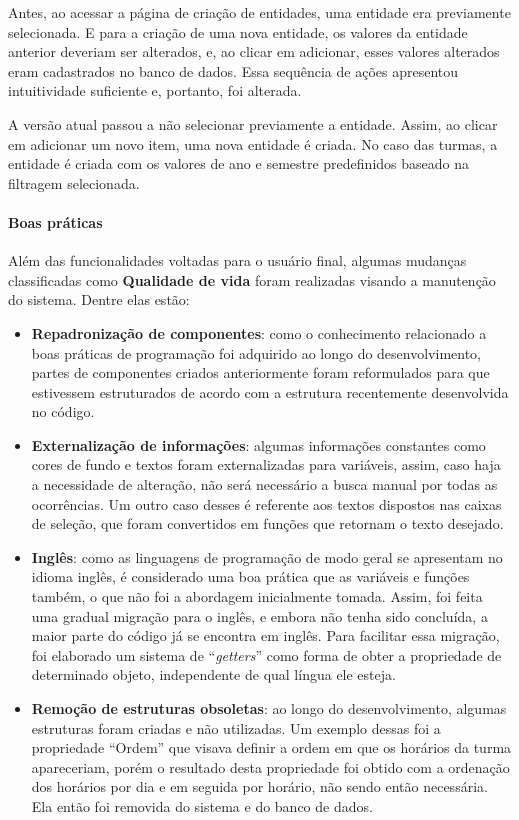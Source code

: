 Antes, ao acessar a página de criação de entidades, uma entidade era previamente selecionada. E para a criação de uma nova entidade, os valores da entidade anterior deveriam ser alterados, e, ao clicar em adicionar, esses valores alterados eram cadastrados no banco de dados. Essa sequência de ações apresentou intuitividade suficiente e, portanto, foi alterada.

A versão atual passou a não selecionar previamente a entidade. Assim, ao clicar em adicionar um novo item, uma nova entidade é criada. No caso das turmas, a entidade é criada com os valores de ano e semestre predefinidos baseado na filtragem selecionada.

\paragraph*{Boas práticas}

Além das funcionalidades voltadas para o usuário final, algumas mudanças classificadas como \textbf{Qualidade de vida} foram realizadas visando a manutenção do sistema. Dentre elas estão:

\begin{itemize}
  \item \textbf{Repadronização de componentes}: como o conhecimento relacionado a boas práticas de programação foi adquirido ao longo do desenvolvimento, partes de componentes criados anteriormente foram reformulados para que estivessem estruturados de acordo com a estrutura recentemente desenvolvida no código.
  \item \textbf{Externalização de informações}: algumas informações constantes como cores de fundo e textos foram externalizadas para variáveis, assim, caso haja a necessidade de alteração, não será necessário a busca manual por todas as ocorrências. Um outro caso desses é referente aos textos dispostos nas caixas de seleção, que foram convertidos em funções que retornam o texto desejado.
  \item \textbf{Inglês}: como as linguagens de programação de modo geral se apresentam no idioma inglês, é considerado uma boa prática que as variáveis e funções também, o que não foi a abordagem inicialmente tomada. Assim, foi feita uma gradual migração para o inglês, e embora não tenha sido concluída, a maior parte do código já se encontra em inglês. Para facilitar essa migração, foi elaborado um sistema de ``\textit{getters}'' como forma de obter a propriedade de determinado objeto, independente de qual língua ele esteja.
  \item \textbf{Remoção de estruturas obsoletas}: ao longo do desenvolvimento, algumas estruturas foram criadas e não utilizadas. Um exemplo dessas foi a propriedade ``Ordem'' que visava definir a ordem em que os horários da turma apareceriam, porém o resultado desta propriedade foi obtido com a ordenação dos horários por dia e em seguida por horário, não sendo então necessária. Ela então foi removida do sistema e do banco de dados.
\end{itemize}

